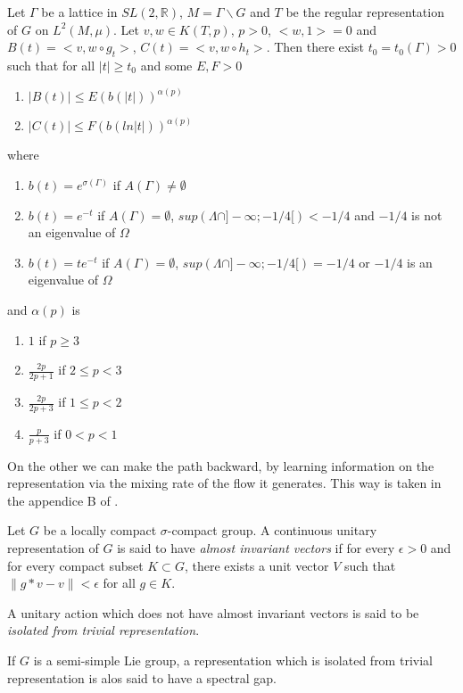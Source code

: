 \begin{thm}
Let $\Gamma$ be a lattice in $SL(2,\mathbb{R})$, $M=\Gamma \backslash G$ and $T$ be the regular representation of $G$ on $L^2 (M, \mu)$. Let $v,w\in K(T,p)$, $p>0$, $<w,1>=0$ and $B(t)=<v,w \circ g_t>$, $C(t)=<v,w \circ h_t>$.
Then there exist $t_0=t_0(\Gamma)>0$ such that for all $|t| \geq t_0$ and some $E,F > 0$
\begin{enumerate}
\item $|B(t)| \leq E( b(|t|))^{\alpha(p)}$
\item $|C(t)| \leq F( b(ln|t|))^{\alpha(p)}$
\end{enumerate}
where

\begin{enumerate}
\item $b(t)=e^{\sigma(\Gamma)}$ if $A(\Gamma) \neq \emptyset$
\item $b(t)=e^{-t}$ if $A(\Gamma) = \emptyset$, $sup(\Lambda \cap ]- \infty; -1/4[) < -1/4$ and $-1/4$ is not an eigenvalue of $\Omega$
\item $b(t)=te^{-t}$ if $A(\Gamma) = \emptyset$, $sup(\Lambda \cap ]- \infty; -1/4[)= -1/4$ or $-1/4$ is an eigenvalue of $\Omega$
\end{enumerate}
and $\alpha(p)$ is
\begin{enumerate}
\item $1$ if $p \geq 3$
\item $\frac{2p}{2p+1}$ if $2 \leq p < 3$
\item $\frac{2p}{2p+3}$ if $1 \leq p < 2$
\item $\frac{p}{p+3}$ if $0<p<1$
\end{enumerate}
\end{thm}


On the other we can make the path backward, by learning information on the representation via the mixing rate of the flow it generates. This way is taken in the appendice B of \cite{2005math.....11614A}.

\begin{dfnt}
Let $G$ be a locally compact $\sigma$-compact group. A continuous unitary
 representation of $G$ is said to have \emph{almost invariant vectors}
 if for every $\epsilon > 0$ and for every compact subset $K \subset G$, there exists a unit vector $V$ such that $\|g*v-v\| < \epsilon$ for all $g \in K$.

 A unitary action which does not have almost invariant vectors is said to be \emph{isolated from trivial representation}.

 If $G$ is a semi-simple Lie group, a representation which is isolated from trivial representation is alos said to have a spectral gap.
\end{dfnt}

